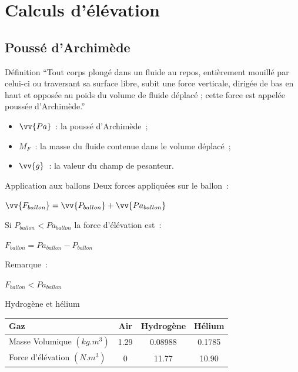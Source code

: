 

\section{Calculs d'élévation}

\subsection{Poussé d'Archimède}

\begin{frame}{Définition}
  \enquote{Tout corps plongé dans un fluide au repos, entièrement mouillé par celui-ci ou traversant sa surface libre, subit une force verticale, dirigée de bas en haut et opposée au poids du volume de fluide déplacé ; cette force est appelée poussée d'Archimède.}
  \bigbreak
  \begin{center}
  \end{center}
  \begin{itemize}
    \item $\vv{Pa}$~: la poussé d'Archimède~;
    \item $M_F$~: la masse du fluide contenue dans le volume déplacé~;
    \item $\vv{g}$~: la valeur du champ de pesanteur.
  \end{itemize}
\end{frame}

\begin{frame}{Application aux ballons}
  Deux forces appliquées sur le ballon~: \\
  \begin{center}
    $\displaystyle{\vv{F_{ballon}} = \vv{P_{ballon}} + \vv{Pa_{ballon}}}$ \\
  \end{center}
  Si $P_{ballon} < Pa_{ballon}$ la force d'élévation est~:
  \begin{center}
    $\displaystyle{F_{ballon} = Pa_{ballon} - P_{ballon}}$ \\
  \end{center}
  Remarque~:\\
  \begin{center}
    $F_{ballon} < Pa_{ballon}$
  \end{center}
\end{frame}

\begin{frame}{Hydrogène et hélium}
	\begin{center}
		\begin{tabular}{|l|c|c|c|}
			\hline
			Gaz & Air & Hydrogène & Hélium \\
			\hline
			Masse Volumique $(kg.m^3)$ & 1.29 & 0.08988 & 0.1785 \\
			\hline
			Force d'élévation $(N.m^3)$ & 0 & 11.77 & 10.90 \\
			\hline
		\end{tabular}
	\end{center}
\end{frame}



